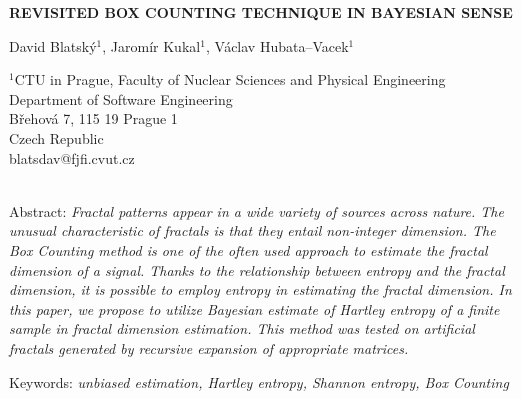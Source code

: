 \documentclass[a4paper,10pt]{article}
\begin{document}
\pagestyle{empty}

\begin{center}
{\bf \Large REVISITED BOX COUNTING TECHNIQUE IN BAYESIAN SENSE}
\end{center}

\smallskip
\begin{center} %
{\large David Blatsk\'{y}$^1$, Jarom\'{i}r Kukal$^1$, V\'{a}clav Hubata--Vacek$^1$}
\end{center}

\smallskip
\begin{center}
$^1$CTU in Prague, Faculty of Nuclear Sciences and Physical Engineering\\
Department of Software Engineering \\
B\v{r}ehov\'{a} 7, 115 19 Prague 1 \\
Czech Republic\\
blatsdav@fjfi.cvut.cz\\
 ~\\

\end{center}

\bigskip
\noindent Abstract: \textit{Fractal patterns appear in a wide variety of sources across nature. The unusual characteristic of fractals is that they entail non-integer dimension. The Box Counting method is one of the often used approach to estimate the fractal dimension of a signal. Thanks to the relationship between entropy and the fractal dimension, it is possible to employ entropy in estimating the fractal dimension. In this paper, we propose to utilize Bayesian estimate of Hartley entropy of a finite sample in fractal dimension estimation. This method was tested on artificial fractals generated by recursive expansion of appropriate matrices.}

\vspace*{10pt} \noindent Keywords: \textit{unbiased estimation, Hartley entropy, Shannon entropy, Box Counting}


\bigskip












\end{document}
